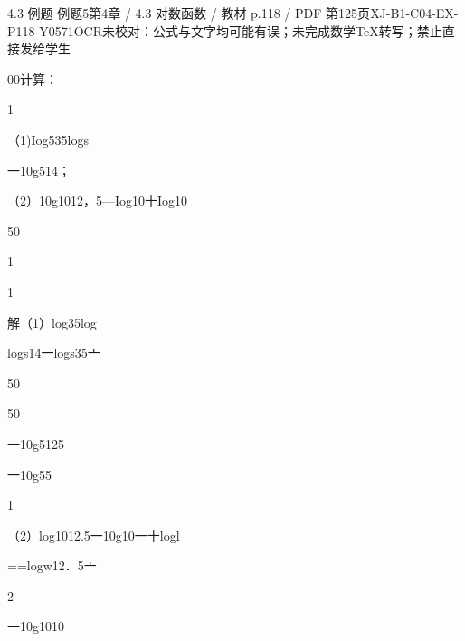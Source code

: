 \begin{bankitem}{4.3 例题 例题5}{第4章 / 4.3 对数函数 / 教材 p.118 / PDF 第125页}{XJ-B1-C04-EX-P118-Y0571}{OCR未校对：公式与文字均可能有误；未完成数学TeX转写；禁止直接发给学生}
\begin{ocrdraft}
\par
00计算：
\par
1
\par
（1)Iog535logs
\par
一10g514；
\par
（2）10g1012，5—Iog10十Iog10
\par
50
\par
1
\par
1
\par
解（1）log35log
\par
{}logs14一logs35亠
\par
50
\par
50
\par
一10g5125
\par
一10g55
\par
1
\par
（2）log1012.5一10g10一十logl
\par
==logw12．5亠
\par
2
\par
一10g1010
\end{ocrdraft}
\end{bankitem}
